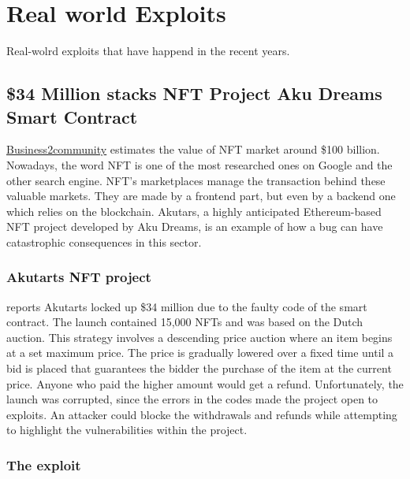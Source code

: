 \chapter{Real world Exploits}
\label{ch:Exploits}
Real-wolrd exploits that have happend in the recent years.

\section{\$34 Million stacks NFT Project Aku Dreams Smart Contract}
\label{sec:Exploits:AkuDreams}
\href{https://www.business2community.com/nft-news/nft-market-size-how-to-track-02467120}{Business2community} estimates the value of NFT market around \$100 billion.
Nowadays, the word NFT is one of the most researched ones on Google and the other search engine.
NFT's marketplaces manage the transaction behind these valuable markets. 
They are made by a frontend part, but even by a backend one which relies on the blockchain. 
Akutars, a highly anticipated Ethereum-based NFT project developed by Aku Dreams, is an example of how a bug can have catastrophic consequences in this sector. 
\subsection{Akutarts NFT project}
\label{sec:AkuDreams:Akutars}
 reports Akutarts locked up \$34 million due to the faulty code of the smart contract.
The launch contained 15,000  NFTs and was based on the Dutch auction. This strategy involves a descending price auction where an item begins at a set maximum price. 
The price is gradually lowered over a fixed time until a bid is placed that guarantees the bidder the purchase of the item at the current price. 
Anyone who paid the higher amount would get a refund.
Unfortunately, the launch was corrupted, since the errors in the codes made the project open to exploits. 
An attacker could blocke the withdrawals and refunds while attempting to highlight the vulnerabilities within the project.
\subsection{The exploit}
\label{sec:AkuDreams:AkutarsExploit}


